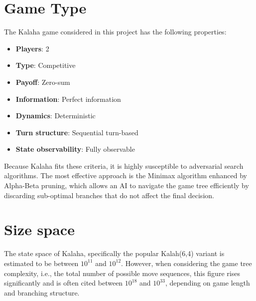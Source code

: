 \documentclass[a4paper,11pt]{article}
\begin{document}
\section{Game Type}
The Kalaha game considered in this project has the following properties:
\begin{itemize}
    \item{\textbf{Players}:} 2
    \item{\textbf{Type}:} Competitive
    \item{\textbf{Payoff}:} Zero-sum
    \item{\textbf{Information}:} Perfect information
    \item{\textbf{Dynamics}:} Deterministic
    \item{\textbf{Turn structure}:} Sequential turn-based
    \item{\textbf{State observability}:} Fully observable
\end{itemize}
Because Kalaha fits these criteria, it is highly susceptible to adversarial search algorithms. The most effective approach is the Minimax algorithm enhanced by Alpha-Beta pruning, which allows an AI to navigate the game tree efficiently by discarding sub-optimal branches that do not affect the final decision.


\section{Size space}
The state space of Kalaha, specifically the popular Kalah(6,4) variant is estimated to be between $10^{11}$ and $10^{12}$. However, when considering the game tree complexity, i.e., the total number of possible move sequences, this figure rises significantly and is often cited between $10^{18}$ and $10^{33}$, depending on game length and branching structure. \\
\end{document}
